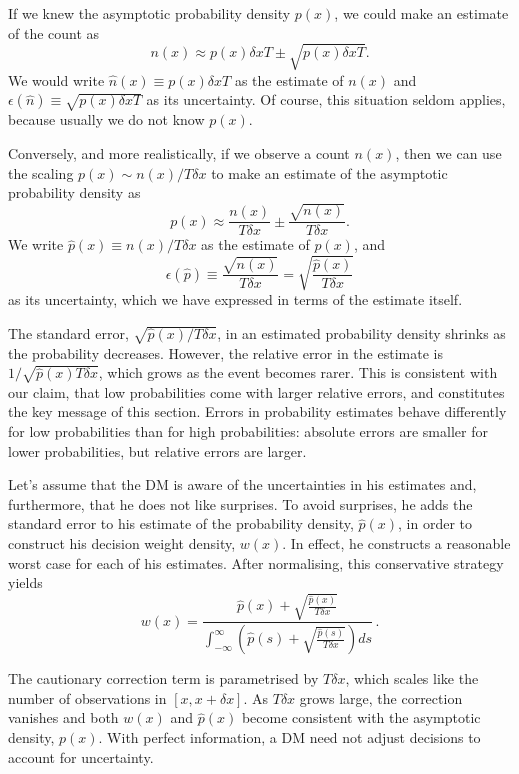 \documentclass[a4paper, 12pt]{article}
\newcommand{\elabel}[1]{\label{eq:#1}}
\newcommand{\err}{\epsilon}
\newcommand{\be}{\begin{equation}}
\newcommand{\ee}{\end{equation}}
\begin{document}
If we knew the asymptotic probability density $p(x)$, we could make an estimate of the count as
\be
n(x) \approx p(x) \delta x T \pm \sqrt{p(x) \delta x T}.
\elabel{count_est}
\ee
We would write $\hat{n}(x) \equiv p(x) \delta x T$ as the estimate of $n(x)$ and $\err(\hat{n}) \equiv \sqrt{p(x) \delta x T}$ as its uncertainty. Of course, this situation seldom applies, because usually we do not know $p(x)$.

Conversely, and more realistically, if we observe a count $n(x)$, then we can use the scaling $ p(x) \sim n(x)/T\delta x$ to make an estimate of the asymptotic probability density as
\be
p(x) \approx \frac{n(x)}{T\delta x} \pm \frac{\sqrt{n(x)}}{T \delta x}.
\elabel{prob_est}
\ee
We write $\hat{p}(x) \equiv n(x)/T\delta x$ as the estimate of $p(x)$, and
\be
\err(\hat{p}) \equiv \frac{\sqrt{n(x)}}{T \delta x} = \sqrt{\frac{\hat{p}(x)}{T \delta x}}
\ee
as its uncertainty, which we have expressed in terms of the estimate itself.

The standard error, $ \sqrt{\hat{p}(x)/T \delta x}$, in an estimated probability density shrinks as the probability decreases. However, the relative error in the estimate is $1/\sqrt{\hat{p}(x)T\delta x}$, which grows as the event becomes rarer. This is consistent with our claim, that low probabilities come with larger relative errors, and constitutes the key message of this section. Errors in probability estimates behave differently for low probabilities than for high probabilities: absolute errors are smaller for lower probabilities, but relative errors are larger. 

Let's assume that the DM is aware of the uncertainties in his estimates and, furthermore, that he does not like surprises. To avoid surprises, he adds the standard error to his estimate of the probability density, $\hat{p}(x)$, in order to construct his decision weight density, $w(x)$. In effect, he constructs a reasonable worst case for each of his estimates. After normalising, this conservative strategy yields
\be
w(x)=\frac{\hat{p}(x)+\sqrt{\frac{\hat{p}(x)}{T \delta x}}}{\int_{-\infty}^{\infty}\left(\hat{p}(s)+\sqrt{\frac{\hat{p}(s)}{T \delta x}}\right)ds}\,.
\elabel{weight_density}
\ee

The cautionary correction term is parametrised by $T\delta x$, which scales like the number of observations in $[x, x+\delta x]$. As $T\delta x$ grows large, the correction vanishes and both $w(x)$ and $\hat{p}(x)$ become consistent with the asymptotic density, $p(x)$. With perfect information, a DM need not adjust decisions to account for uncertainty.
\end{document}
